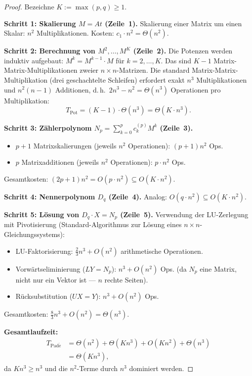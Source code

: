 \documentclass[a4paper,12pt]{report}
\theoremstyle{definition}
\begin{document}
	\begin{proof}
		Bezeichne $K := \max(p, q) \geq 1$.

		\textbf{Schritt 1: Skalierung $M = At$ (Zeile~1).} Skalierung einer Matrix um einen Skalar: $n^2$ Multiplikationen. Kosten: $c_1 \cdot n^2 = \Theta(n^2)$.

		\textbf{Schritt 2: Berechnung von $M^2, \ldots, M^K$ (Zeile~2).} Die Potenzen werden induktiv aufgebaut: $M^k = M^{k-1} \cdot M$ für $k = 2, \ldots, K$. Das sind $K - 1$ Matrix-Matrix-Multiplikationen zweier $n{\times}n$-Matrizen. Die standard Matrix-Matrix-Multiplikation (drei geschachtelte Schleifen) erfordert exakt $n^3$ Multiplikationen und $n^2(n-1)$ Additionen, d.\,h.\ $2n^3 - n^2 = \Theta(n^3)$ Operationen pro Multiplikation:
		\[
			T_{\mathrm{Pot}} = (K-1) \cdot \Theta(n^3) = \Theta(K \cdot n^3).
		\]

		\textbf{Schritt 3: Zählerpolynom $N_p = \sum_{k=0}^p c_k^{(p)} M^k$ (Zeile~3).}
		\begin{itemize}
			\item $p+1$ Matrixskalierungen (jeweils $n^2$ Operationen): $(p+1) n^2$ Ops.
			\item $p$ Matrixadditionen (jeweils $n^2$ Operationen): $p \cdot n^2$ Ops.
		\end{itemize}
		Gesamtkosten: $(2p+1) n^2 = O(p \cdot n^2) \subseteq O(K \cdot n^2)$.

		\textbf{Schritt 4: Nennerpolynom $D_q$ (Zeile~4).} Analog: $O(q \cdot n^2) \subseteq O(K \cdot n^2)$.

		\textbf{Schritt 5: Lösung von $D_q \cdot X = N_p$ (Zeile~5).} Verwendung der LU-Zer\-legung mit Pivotisierung (Standard-Algorithmus zur Lösung eines $n{\times}n$-Gleichungssystems):
		\begin{itemize}
			\item LU-Faktorisierung: $\frac{2}{3}n^3 + O(n^2)$ arithmetische Operationen.
			\item Vorwärtseliminierung ($LY = N_p$): $n^3 + O(n^2)$ Ops. (da $N_p$ eine Matrix, nicht nur ein Vektor ist --- $n$ rechte Seiten).
			\item Rücksubstitution ($UX = Y$): $n^3 + O(n^2)$ Ops.
		\end{itemize}
		Gesamtkosten: $\frac{8}{3}n^3 + O(n^2) = \Theta(n^3)$.

		\textbf{Gesamtlaufzeit:}
		\begin{align*}
			T_{\mathrm{Pad\acute{e}}} &= \Theta(n^2) + \Theta(K n^3) + O(K n^2) + \Theta(n^3) \\
			&= \Theta(K n^3),
		\end{align*}
		da $K n^3 \geq n^3$ und die $n^2$-Terme durch $n^3$ dominiert werden.


\end{proof}
\end{document}
